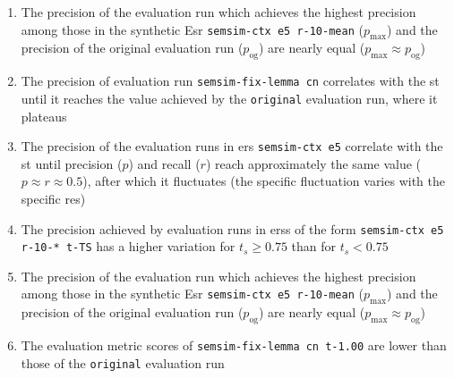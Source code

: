 \documentclass[11pt, numbers=noenddot]{scrreprt}
\newcounter{listcounter}
\begin{document}
\begin{enumerate}[label=\arabic{listcounter}.\arabic*]
	\item The precision of the evaluation run which achieves the highest precision among those in the synthetic E\gls{sr} \texttt{semsim-ctx e5 r-10-mean} (\(p_\text{max}\)) and the precision of the original evaluation run (\(p_\text{og}\)) are nearly equal (\(p_\text{max} \approx p_\text{og}\)) \label{obs-itm:cness-highest-precision-equal-original} 	
	\item The precision of evaluation run \texttt{semsim-fix-lemma cn}  correlates with the \gls{st} until it reaches the value achieved by the \texttt{original} evaluation run, where it plateaus \label{obs-itm:fness-st-precision-correlates}
	\item The precision of the evaluation runs in \gls{ers} \texttt{semsim-ctx e5} correlate with the \gls{st} until precision (\(p\)) and recall (\(r\)) reach approximately the same value (\(p \approx r \approx 0.5\)), after which it fluctuates (the specific fluctuation varies with the specific \gls{res}) \label{obs-itm:cness-st-precision-correlates-until-crosspoint}

	\item The precision achieved by evaluation runs in \gls{ers}s of the form \texttt{semsim-ctx e5 r-10-* t-TS} has a higher variation for \(t_s \geq 0.75\) than for \(t_s < 0.75\) \label{obs-itm:cness-precision-variation-higher-ASTR}
	\item The precision of the evaluation run which achieves the highest precision among those in the synthetic E\gls{sr} \texttt{semsim-ctx e5 r-10-mean} (\(p_\text{max}\)) and the precision of the original evaluation run (\(p_\text{og}\)) are nearly equal (\(p_\text{max} \approx p_\text{og}\)) \label{obs-itm:cness-highest-precision-equal-original} 	
	\item The evaluation metric scores of \texttt{semsim-fix-lemma cn t-1.00} are lower than those of the \texttt{original} evaluation run \label{obs-itm:fness-st-limit}


\end{enumerate} 
\end{document}
